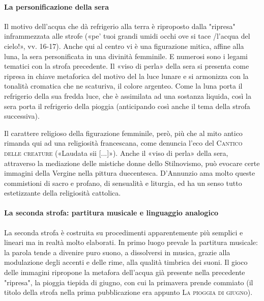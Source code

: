\documentclass{book}
\begin{document}
\paragraph{La personificazione della sera}

Il motivo dell'acqua che dà refrigerio alla terra è riproposto dalla "ripresa" inframmezzata alle strofe («pe' tuoi grandi umidi occhi ove si tace /l'acqua del cielo!», vv. 16-17). Anche qui al centro vi è una figurazione mitica, affine alla luna, la sera personificata in una divinità femminile. E numerosi sono i legami tematici con la strofa precedente. Il «viso di perla» della sera si presenta come ripresa in chiave metaforica del motivo del la luce lunare e si armonizza con la tonalità cromatica che ne scaturiva, il colore argenteo. Come la luna porta il refrigerio della sua fredda luce, che è assimilata ad una sostanza liquida, così la sera porta il refrigerio della pioggia (anticipando così anche il tema della strofa successiva).

Il carattere religioso della figurazione femminile, però, più che al mito antico rimanda qui ad una religiosità francescana, come denuncia l'eco del \textsc{Cantico delle creature} («Laudata sii [...]»). Anche il «viso di perla» della sera, attraverso la mediazione delle mistiche donne dello Stilnovismo, può evocare certe immagini della Vergine nella pittura duecentesca. D'Annunzio ama molto queste commistioni di sacro e profano, di sensualità e liturgia, ed ha un senso tutto estetizzante della religiosità cattolica.

\paragraph{La seconda strofa: partitura musicale e linguaggio analogico }

La seconda strofa è costruita su procedimenti apparentemente più semplici e lineari ma in realtà molto elaborati. In primo luogo prevale la partitura musicale: la parola tende a divenire puro suono, a dissolversi in musica, grazie alla modulazione degli accenti e delle rime, alla qualità timbrica dei suoni. Il gioco delle immagini ripropone la metafora dell'acqua già presente nella precedente "ripresa", la pioggia tiepida di giugno, con cui la primavera prende commiato (il titolo della strofa nella prima pubblicazione era appunto \textsc{La pioggia di giugno}).
\end{document}
